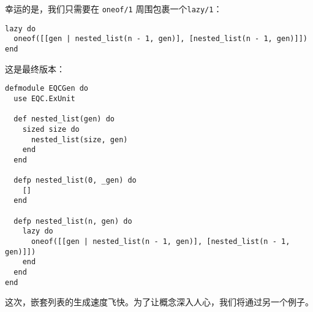 幸运的是，我们只需要在 \texttt{oneof/1} 周围包裹一个\texttt{lazy/1}：

\begin{code}{}
\begin{verbatim}
lazy do
  oneof([[gen | nested_list(n - 1, gen)], [nested_list(n - 1, gen)]])
end
\end{verbatim}
\end{code}

这是最终版本：

\begin{code}{}
\begin{verbatim}
defmodule EQCGen do
  use EQC.ExUnit

  def nested_list(gen) do
    sized size do
      nested_list(size, gen)
    end
  end

  defp nested_list(0, _gen) do
    []
  end

  defp nested_list(n, gen) do
    lazy do
      oneof([[gen | nested_list(n - 1, gen)], [nested_list(n - 1, gen)]])
    end
  end
end
\end{verbatim}
\end{code}

这次，嵌套列表的生成速度飞快。为了让概念深入人心，我们将通过另一个例子。

